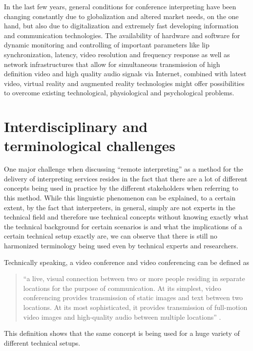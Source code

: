\documentclass[output=paper]{langsci/langscibook}
\begin{document}
In the last few years, general conditions for conference interpreting have been changing constantly due to globalization and altered market needs, on the one hand, but also due to digitalization and extremely fast developing information and communication technologies. The availability of hardware and software for dynamic monitoring and controlling of important parameters like lip synchronization, latency, video resolution and frequency response as well as network infrastructures that allow for simultaneous transmission of high definition video and high quality audio signals via Internet, combined with latest video, virtual reality and augmented reality technologies might offer possibilities to overcome existing technological, physiological and psychological problems. 

\section{Interdisciplinary and terminological challenges}
\label{sec:ziegler:02}
One major challenge when discussing “remote interpreting” as a method for the delivery of interpreting services resides in the fact that there are a lot of different concepts being used in practice by the different stakeholders when referring to this method. While this linguistic phenomenon can be explained, to a certain extent, by the fact that interpreters, in general, simply are not experts in the technical field and therefore use technical concepts without knowing exactly what the technical background for certain scenarios is and what the implications of a certain technical setup exactly are, we can observe that there is still no harmonized terminology being used even by technical experts and researchers. 

Technically speaking, a video conference and video conferencing can be defined as 

\begin{quote}
	“a live, visual connection between two or more people residing in separate locations for the purpose of communication. At its simplest, video conferencing provides transmission of static images and text between two locations. At its most sophisticated, it provides transmission of full-motion video images and high-quality audio between multiple locations” \citep{TechTarget2017}.
\end{quote}

This definition shows that the same concept is being used for a huge variety of different technical setups.
\end{document}
